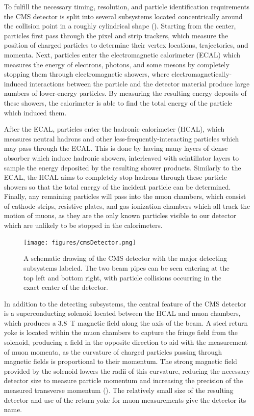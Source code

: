 To fulfill the necessary timing, resolution, and particle identification requirements the CMS detector is split into several subsystems located concentrically around the collision point in a roughly cylindrical shape (). 
Starting from the center, particles first pass through the pixel and strip trackers, which measure the position of charged particles to determine their vertex locations, trajectories, and momenta.
Next, particles enter the electromagnetic calorimeter (ECAL) which measures the energy of electrons, photons, and some mesons by completely stopping them through electromagnetic showers, where electromagnetically-induced interactions between the particle and the detector material produce large numbers of lower-energy particles.
By measuring the resulting energy deposits of these showers, the calorimeter is able to find the total energy of the particle which induced them.

After the ECAL, particles enter the hadronic calorimeter (HCAL), which measures neutral hadrons and other less-frequently-interacting particles which may pass through the ECAL. This is done by having many layers of dense absorber which induce hadronic showers, interleaved with scintillator layers to sample the energy deposited by the resulting shower products.
Similarly to the ECAL, the HCAL aims to completely stop hadrons through these particle showers so that the total energy of the incident particle can be determined.
Finally, any remaining particles will pass into the muon chambers, which consist of cathode strips, resistive plates, and gas-ionization chambers which all track the motion of muons, as they are the only known particles visible to our detector which are unlikely to be stopped in the calorimeters.

\begin{figure}[htpb]
    \texttt{[image: figures/cmsDetector.png]}
    \centering
	\caption[The CMS Detector]{A schematic drawing of the CMS detector with the major detecting subsystems labeled. The two beam pipes can be seen entering at the top left and bottom right, with particle collisions occurring in the exact center of the detector.}
    \label{fig:detector}
\end{figure}

In addition to the detecting subsystems, the central feature of the CMS detector is a superconducting solenoid located between the HCAL and muon chambers, which produces a \SI{3.8}{\tesla} magnetic field along the axis of the beam. 
A steel return yoke is located within the muon chambers to capture the fringe field from the solenoid, producing a field in the opposite direction to aid with the measurement of muon momenta, as the curvature of charged particles passing through magnetic fields is proportional to their momentum. The strong magnetic field provided by the solenoid lowers the radii of this curvature, reducing the necessary detector size to measure particle momentum and increasing the precision of the measured transverse momentum (\pt). 
The relatively small size of the resulting detector and use of the return yoke for muon measurements give the detector its name.

